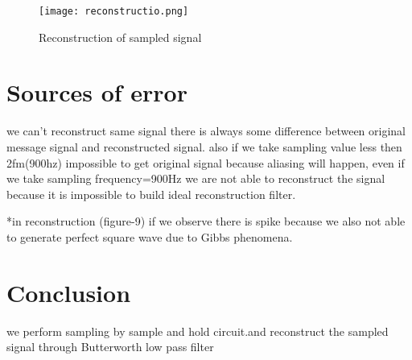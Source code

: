 \documentclass{article}
\begin{document}
\begin{figure*}[h]
	\centering
	\texttt{[image: reconstructio.png]}
	\caption{Reconstruction of sampled signal}
	\label{obs}
\end{figure*}






\section{Sources of error}
we can't reconstruct same signal there is always some difference between original message signal and reconstructed signal.
 also if we take sampling value less then 2fm(900hz) impossible to get original signal because aliasing will happen, even if we take sampling frequency=900Hz we are not able to reconstruct the signal because it is impossible to build ideal reconstruction filter.\par
*in reconstruction (figure-9) if we observe there is spike because we also not able to generate perfect square wave due to Gibbs phenomena.
 


\section{Conclusion}
 we perform sampling by sample and hold circuit.and reconstruct the sampled signal through Butterworth low pass filter
\end{document}
